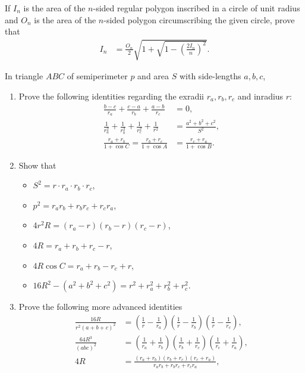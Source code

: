 \documentclass[12pt,a4paper]{memoir}
\theoremstyle{definition}
\begin{document}
\begin{question}[name=2003 IIT JEE]
	If $I_n$ is the area of the $n$-sided regular polygon inscribed in a circle of unit radius and $O_n$ is the area of the $n$-sided polygon circumscribing the given circle, prove that
	\begin{align*}
		I_n &= \frac{O_n}{2}\sqrt{1+\sqrt{1-\left(\frac{2I_n}{n}\right)^2}}.
	\end{align*}
\end{question}



	\begin{question}[name={Makshud's Excentral Identities}]
		In triangle $ABC$ of semiperimeter $p$ and area $S$ with side-lengths $a,b,c$,
		\begin{enumerate}
			\item Prove the following identities regarding the exradii $r_a,r_b,r_c$ and inradius $r$:
			\begin{align*}
				\frac{b-c}{r_a}+\frac{c-a}{r_b}+\frac{a-b}{r_c} &=0,\\
				\frac{1}{r_a^2}+\frac{1}{r_b^2}+\frac{1}{r_c^2}+\frac{1}{r^2} &=\frac{a^2+b^2+c^2}{S^2},\\
				\frac{r_a+r_b}{1+\cos C} = \frac{r_b+r_c}{1+\cos A} &=\frac{r_c+r_a}{1+\cos B}.
			\end{align*}
			\item Show that
			\begin{itemize}
				\item $S^2 = r\cdot r_a \cdot r_b \cdot r_c$,
				\item $p^2 = r_ar_b+r_br_c+r_cr_a$,
				\item $4r^2R = (r_a-r)(r_b-r)(r_c-r)$,
				\item $4R = r_a+r_b+r_c-r$,
				\item $4R\cos C = r_a+r_b-r_c+r$,
				\item $16R^2-(a^2+b^2+c^2) = r^2+r_a^2+r_b^2+r_c^2$.
			\end{itemize}
			\item Prove the following more advanced identities
			\begin{align*}
				\frac{16R}{r^2(a+b+c)^2} &= \left(\frac{1}{r}-\frac{1}{r_a}\right)\left(\frac{1}{r}-\frac{1}{r_b}\right)\left(\frac{1}{r}-\frac{1}{r_c}\right),\\
				\frac{64R^3}{(abc)^2} &= \left(\frac{1}{r_a}+\frac{1}{r_b}\right)\left(\frac{1}{r_b}+\frac{1}{r_c}\right)\left(\frac{1}{r_c}+\frac{1}{r_a}\right),\\
				4R &= \frac{(r_a+r_b)(r_b+r_c)(r_c+r_a)}{r_ar_b+r_br_c+r_cr_a},\\

\end{align*}
\end{enumerate}
\end{question}
\end{document}
